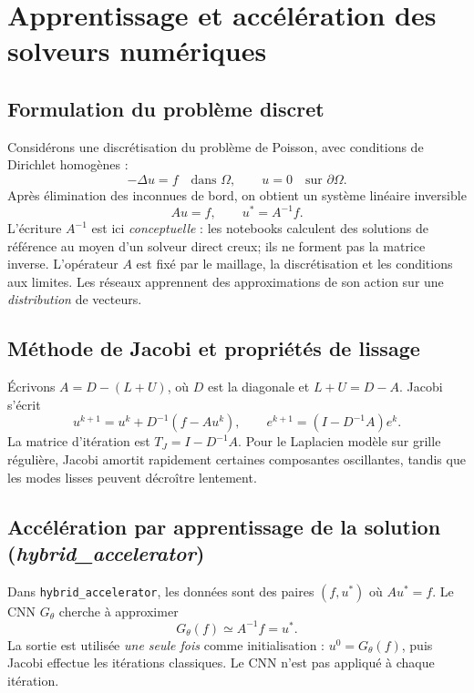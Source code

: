 \documentclass[11pt,a4paper]{article}
\begin{document}
\section{Apprentissage et accélération des solveurs numériques}

\subsection{Formulation du problème discret}

Considérons une discrétisation du problème de Poisson, avec conditions de Dirichlet homogènes :
\[-\Delta u=f\quad\text{dans }\Omega,\qquad u=0\quad\text{sur }\partial\Omega.\]
Après élimination des inconnues de bord, on obtient un système linéaire inversible
\[Au=f,\qquad u^*=A^{-1}f.\]
L'écriture $A^{-1}$ est ici \emph{conceptuelle} : les notebooks calculent des solutions de référence au moyen d'un solveur direct creux; ils ne forment pas la matrice inverse. L'opérateur $A$ est fixé par le maillage, la discrétisation et les conditions aux limites. Les réseaux apprennent des approximations de son action sur une \emph{distribution} de vecteurs.

\subsection{Méthode de Jacobi et propriétés de lissage}

Écrivons $A=D-(L+U)$, où $D$ est la diagonale et $L+U=D-A$. Jacobi s'écrit
\[u^{k+1}=u^k+D^{-1}(f-Au^k),\qquad e^{k+1}=(I-D^{-1}A)e^k.\]
La matrice d'itération est $T_J=I-D^{-1}A$. Pour le Laplacien modèle sur grille régulière, Jacobi amortit rapidement certaines composantes oscillantes, tandis que les modes lisses peuvent décroître lentement. 

\subsection{Accélération par apprentissage de la solution (\textit{hybrid\_accelerator})}

Dans \texttt{hybrid\_accelerator}, les données sont des paires $(f,u^*)$ où $Au^*=f$. Le CNN $G_\theta$ cherche à approximer
\[\boxed{G_\theta(f)\simeq A^{-1}f=u^*.}\]
La sortie est utilisée \emph{une seule fois} comme initialisation : $u^0=G_\theta(f)$, puis Jacobi effectue les itérations classiques. Le CNN n'est pas appliqué à chaque itération.
\begin{center}\end{center}
\end{document}

